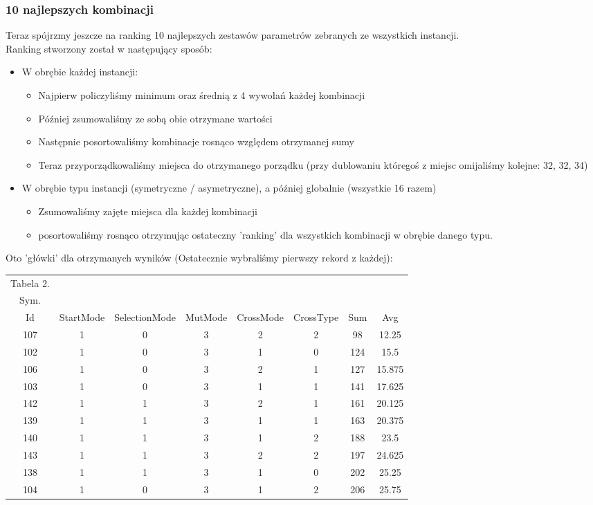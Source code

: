 \documentclass{article}
\begin{document}
\subsubsection{10 najlepszych kombinacji}
Teraz spójrzmy jeszcze na ranking 10 najlepszych zestawów parametrów zebranych ze wszystkich instancji.\\
Ranking stworzony został w następujący sposób:
\begin{itemize}
	\item W obrębie każdej instancji:
	\begin{itemize}
		\item Najpierw policzyliśmy minimum oraz średnią z 4 wywołań każdej kombinacji
		\item Później zsumowaliśmy ze sobą obie otrzymane wartości
		\item Następnie posortowaliśmy kombinacje rosnąco względem otrzymanej sumy
		\item Teraz przyporządkowaliśmy miejsca do otrzymanego porządku (przy dublowaniu któregoś z miejsc omijaliśmy kolejne: 32, 32, 34)	
	\end{itemize}
	\item W obrębie typu instancji (symetryczne / asymetryczne),  a później globalnie (wszystkie 16 razem)
	\begin{itemize}
		\item Zsumowaliśmy zajęte miejsca dla każdej kombinacji
		\item posortowaliśmy rosnąco otrzymując ostateczny 'ranking' dla wszystkich kombinacji w obrębie danego typu.	
	\end{itemize}
\end{itemize}

Oto 'główki' dla otrzymanych wyników (Ostatecznie wybraliśmy pierwszy rekord z każdej):
\begin{table}[h!]
	\centering
	\begin{tabular}{c||c|c|c|c|c||c|c}
Tabela 2.\\
Sym.\\
Id & StartMode & SelectionMode & MutMode & CrossMode & CrossType & Sum & Avg \\
\hline
107 & 1 & 0 & 3 & 2 & 2 & 98 & 12.25 \\
102 & 1 & 0 & 3 & 1 & 0 & 124 & 15.5 \\
106 & 1 & 0 & 3 & 2 & 1 & 127 & 15.875 \\
103 & 1 & 0 & 3 & 1 & 1 & 141 & 17.625 \\
142 & 1 & 1 & 3 & 2 & 1 & 161 & 20.125 \\
139 & 1 & 1 & 3 & 1 & 1 & 163 & 20.375 \\
140 & 1 & 1 & 3 & 1 & 2 & 188 & 23.5 \\
143 & 1 & 1 & 3 & 2 & 2 & 197 & 24.625 \\
138 & 1 & 1 & 3 & 1 & 0 & 202 & 25.25 \\
104 & 1 & 0 & 3 & 1 & 2 & 206 & 25.75 \\
	\end{tabular}
\end{table}
\end{document}
